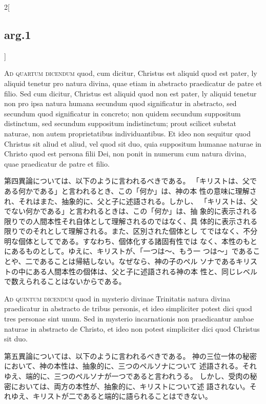 \documentclass[paper=a4paper,fontsize=10pt,jafontsize=9pt,titlepage]{jlreq}
\begin{document}
\begin{paracol}{2}[\subsection{arg.1}]
\switchcolumn*[\subsection{ad.4}]

{\scshape Ad quartum dicendum} quod, cum dicitur,
 Christus est aliquid quod est pater, ly aliquid tenetur pro natura
 divina, quae etiam in abstracto praedicatur de patre et filio. Sed cum
 dicitur, Christus est aliquid quod non est pater, ly aliquid tenetur
 non pro ipsa natura humana secundum quod significatur in abstracto, sed
 secundum quod significatur in concreto; non quidem secundum suppositum
 distinctum, sed secundum suppositum indistinctum; prout scilicet
 substat naturae, non autem proprietatibus individuantibus. Et ideo non
 sequitur quod Christus sit aliud et aliud, vel quod sit duo, quia
 suppositum humanae naturae in Christo quod est persona filii Dei, non
 ponit in numerum cum natura divina, quae praedicatur de patre et filio.

\switchcolumn

第四異論については、以下のように言われるべきである。
「キリストは、父である何かである」と言われるとき、この「何か」は、神の本
 性の意味に理解され、それはまた、抽象的に、父と子に述語される。しかし、
 「キリストは、父でない何かである」と言われるときは、この「何か」は、抽
 象的に表示される限りでの人間本性それ自体として理解されるのではなく、具
 体的に表示される限りでのそれとして理解される。また、区別された個体とし
 てではなく、不分明な個体としてである。すなわち、個体化する諸固有性では
 なく、本性のもとにあるものとして。ゆえに、キリストが、「一つは〜、もう一
 つは〜」であることや、二であることは帰結しない。なぜなら、神の子のペル
 ソナであるキリストの中にある人間本性の個体は、父と子に述語される神の本
 性と、同じレベルで数えられることはないからである。

\switchcolumn*[\subsection{ad.5}]

{\scshape Ad quintum dicendum} quod in mysterio
 divinae Trinitatis natura divina praedicatur in abstracto de tribus
 personis, et ideo simpliciter potest dici quod tres personae sint
 unum. Sed in mysterio incarnationis non praedicantur ambae naturae in
 abstracto de Christo, et ideo non potest simpliciter dici quod Christus
 sit duo.

\switchcolumn

第五異論については、以下のように言われるべきである。
神の三位一体の秘密において、神の本性は、抽象的に、三つのペルソナについて
 述語される。それゆえ、端的に、三つのペルソナが一つであると言われうる。
しかし、受肉の秘密においては、両方の本性が、抽象的に、キリストについて述
 語されない。それゆえ、キリストが二であると端的に語られることはできない。


\end{paracol}
\end{document}
